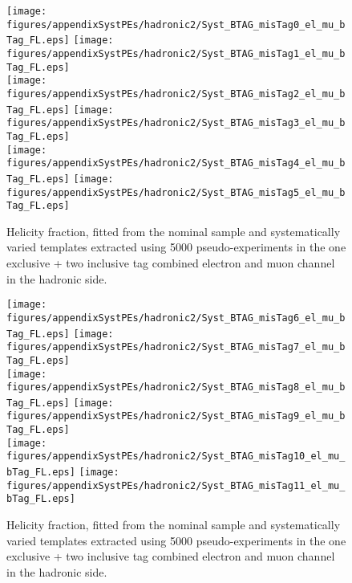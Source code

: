 \begin{figure}[!hb]
\begin{center}
        \texttt{[image: figures/appendixSystPEs/hadronic2/Syst\_BTAG\_misTag0\_el\_mu\_bTag\_FL.eps]}
        \texttt{[image: figures/appendixSystPEs/hadronic2/Syst\_BTAG\_misTag1\_el\_mu\_bTag\_FL.eps]}\\
        \texttt{[image: figures/appendixSystPEs/hadronic2/Syst\_BTAG\_misTag2\_el\_mu\_bTag\_FL.eps]}
        \texttt{[image: figures/appendixSystPEs/hadronic2/Syst\_BTAG\_misTag3\_el\_mu\_bTag\_FL.eps]}\\
        \texttt{[image: figures/appendixSystPEs/hadronic2/Syst\_BTAG\_misTag4\_el\_mu\_bTag\_FL.eps]}
        \texttt{[image: figures/appendixSystPEs/hadronic2/Syst\_BTAG\_misTag5\_el\_mu\_bTag\_FL.eps]}
        
\caption{Helicity fraction, \fl fitted from the nominal \ttbar sample and systematically varied templates extracted using 5000 pseudo-experiments in the one exclusive + two inclusive \bt tag combined electron and muon channel in the hadronic side. }
\label{fig:systematicVar_lep_fL_elmu2incl_btag3_1}
\end{center}
\end{figure}

\begin{figure}[!hb]
\begin{center}
        \texttt{[image: figures/appendixSystPEs/hadronic2/Syst\_BTAG\_misTag6\_el\_mu\_bTag\_FL.eps]}
        \texttt{[image: figures/appendixSystPEs/hadronic2/Syst\_BTAG\_misTag7\_el\_mu\_bTag\_FL.eps]}\\
        \texttt{[image: figures/appendixSystPEs/hadronic2/Syst\_BTAG\_misTag8\_el\_mu\_bTag\_FL.eps]}
        \texttt{[image: figures/appendixSystPEs/hadronic2/Syst\_BTAG\_misTag9\_el\_mu\_bTag\_FL.eps]}\\
        \texttt{[image: figures/appendixSystPEs/hadronic2/Syst\_BTAG\_misTag10\_el\_mu\_bTag\_FL.eps]}
        \texttt{[image: figures/appendixSystPEs/hadronic2/Syst\_BTAG\_misTag11\_el\_mu\_bTag\_FL.eps]}
        
\caption{Helicity fraction, \fl fitted from the nominal \ttbar sample and systematically varied templates extracted using 5000 pseudo-experiments in the one exclusive + two inclusive \bt tag combined electron and muon channel in the hadronic side. }
\label{fig:systematicVar_lep_fL_elmu2incl_btag3_2}
\end{center}
\end{figure}

